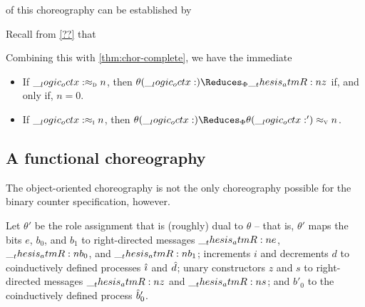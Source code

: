  of this choreography can be established by 

Recall from \cref{??} that 

Combining this with \cref{thm:chor-complete}, we have the immediate 
\begin{corollary}
  \begin{itemize}
  \item If $\__logic_octx: \approx\sb{\text{\normalfont\scshape d}} n$, then $\theta(\octx) \Reduces_{\orsig} \atmR{z}$ if, and only if, $n = 0$.
  \item If $\__logic_octx: \approx\sb{\text{\normalfont\scshape i}} n$, then $\theta(\octx) \Reduces_{\orsig} \aval{\theta(\octx')}{n}$.
  \end{itemize}
\end{corollary}



\subsection{A functional choreography}

The object-oriented choreography is not the only choreography possible for the binary counter specification, however.

Let $\theta'$ be the role assignment that is (roughly) dual to $\theta$ -- that is, $\theta'$ maps the bits $e$, $b_0$, and $b_1$ to right-directed messages $\__thesis_atmR:n {e}$, $\__thesis_atmR:n {b}_0$, and $\__thesis_atmR:n {b}_1$; increments $i$ and decrements $d$ to coinductively defined processes $\hat{\imath}$ and $\hat{d}$; unary constructors $z$ and $s$ to right-directed messages $\__thesis_atmR:n {z}$ and $\__thesis_atmR:n {s}$; and $b'_0$ to the coinductively defined process $\hat{b}'_0$.%

